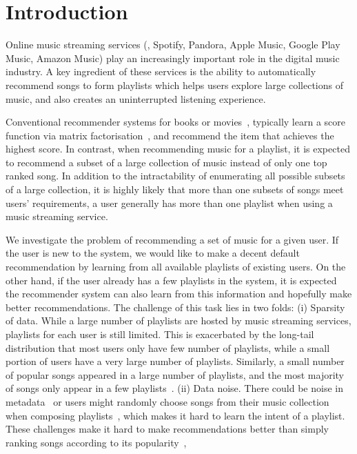 \section{Introduction}
\label{sec:intro}
Online music streaming services (\eg, Spotify, Pandora, Apple Music, Google Play Music, Amazon Music) 
play an increasingly important role in the digital music industry.
A key ingredient of these services is the ability to automatically recommend songs to form playlists
which helps users explore large collections of music,
and also creates an uninterrupted listening experience.

Conventional recommender systems for books or movies~\citep{Sarwar:2001,Netflix},
typically learn a score function via matrix factorisation~\citep{Koren:2009},
and recommend the item that achieves the highest score.
%
In contrast, when recommending music for a playlist, 
it is expected to recommend a subset of a large collection of music instead of only one top ranked song.
In addition to the intractability of enumerating all possible subsets of a large collection,
it is highly likely that more than one subsets of songs meet users' requirements,
\eg a user generally has more than one playlist when using a music streaming service.

We investigate the problem of recommending a set of music for a given user.
If the user is new to the system, we would like to make a decent default recommendation by learning from 
all available playlists of existing users.
On the other hand, if the user already has a few playlists in the system, it is expected the recommender 
system can also learn from this information and hopefully make better recommendations.
%
The challenge of this task lies in two folds:
(i) Sparsity of data. While a large number of playlists are hosted by music streaming services,
playlists for each user is still limited. This is exacerbated by the long-tail distribution that
most users only have few number of playlists, while a small portion of users have a very large number of playlists.
Similarly, a small number of popular songs appeared in a large number of playlists, and the most majority of songs
only appear in a few playlists~\cite{bonnin2013evaluating}.
(ii) Data noise. There could be noise in metadata~\cite{bonnin2015automated} or users might randomly choose songs 
from their music collection when composing playlists~\cite{mcfee2012hypergraph},
which makes it hard to learn the intent of a playlist.
These challenges make it hard to make recommendations better than simply ranking songs according to its 
popularity~\cite{mcfee2012million,bonnin2013evaluating,bonnin2015automated},


